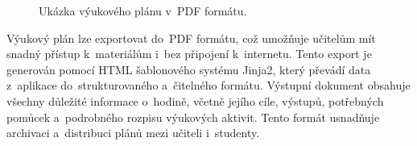 \documentclass[male,czech,api_bc]{kitheses}
\begin{document}
\begin{figure}[H]
	\centering
	\caption{Ukázka výukového plánu v~PDF formátu.}
	\label{fig:edubo-2}
\end{figure}

Výukový plán lze exportovat do~PDF formátu, což umožňuje učitelům mít snadný přístup k~materiálům i~bez připojení k~internetu. Tento export je generován pomocí HTML šablonového systému Jinja2, který převádí data z~aplikace do~strukturovaného a~čitelného formátu. Výstupní dokument obsahuje všechny důležité informace o~hodině, včetně jejího cíle, výstupů, potřebných pomůcek a~podrobného rozpisu výukových aktivit. Tento formát usnadňuje archivaci a~distribuci plánů mezi učiteli i~studenty.

\newpage
\end{document}
